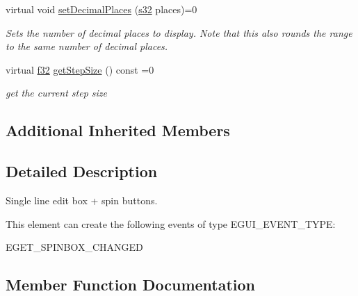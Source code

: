 \begin{DoxyCompactItemize}
virtual void \hyperlink{classirr_1_1gui_1_1IGUISpinBox_a8a335d32cbdb7f43ca814422f8cee098}{set\+Decimal\+Places} (\hyperlink{namespaceirr_ac66849b7a6ed16e30ebede579f9b47c6}{s32} places)=0
\begin{DoxyCompactList}\small\item\em Sets the number of decimal places to display. Note that this also rounds the range to the same number of decimal places. \end{DoxyCompactList}\item 
\mbox{\label{classirr_1_1gui_1_1IGUISpinBox_a5c66183b25860667488ff6c97df241bd}} 
virtual \hyperlink{namespaceirr_a0277be98d67dc26ff93b1a6a1d086b07}{f32} \hyperlink{classirr_1_1gui_1_1IGUISpinBox_a5c66183b25860667488ff6c97df241bd}{get\+Step\+Size} () const =0
\begin{DoxyCompactList}\small\item\em get the current step size \end{DoxyCompactList}\end{DoxyCompactItemize}
\subsection*{Additional Inherited Members}


\subsection{Detailed Description}
Single line edit box + spin buttons. 

\begin{DoxyParagraph}{This element can create the following events of type E\+G\+U\+I\+\_\+\+E\+V\+E\+N\+T\+\_\+\+T\+Y\+PE\+:}
\begin{DoxyItemize}
\item E\+G\+E\+T\+\_\+\+S\+P\+I\+N\+B\+O\+X\+\_\+\+C\+H\+A\+N\+G\+ED \end{DoxyItemize}

\end{DoxyParagraph}


\subsection{Member Function Documentation}
\mbox{\label{classirr_1_1gui_1_1IGUISpinBox_a8a335d32cbdb7f43ca814422f8cee098}} 
